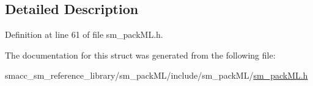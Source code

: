 \subsection{Detailed Description}


Definition at line 61 of file sm\+\_\+pack\+M\+L.\+h.



The documentation for this struct was generated from the following file\+:\begin{DoxyCompactItemize}
\item 
smacc\+\_\+sm\+\_\+reference\+\_\+library/sm\+\_\+pack\+M\+L/include/sm\+\_\+pack\+M\+L/\hyperlink{sm__packML_8h}{sm\+\_\+pack\+M\+L.\+h}\end{DoxyCompactItemize}
